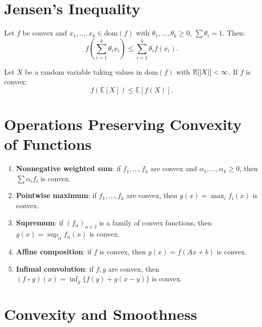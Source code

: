 \section{Jensen's Inequality}

\begin{theorem}
Let $f$ be convex and $x_1, \ldots, x_k \in \mathrm{dom}(f)$ with
$\theta_1, \ldots, \theta_k \geq 0$, $\sum \theta_i = 1$. Then:
\[
    f\left(\sum_{i=1}^k \theta_i x_i\right) \leq \sum_{i=1}^k \theta_i f(x_i).
\]
\end{theorem}

\begin{corollary}
Let $X$ be a random variable taking values in $\mathrm{dom}(f)$ with
$\mathbb{E}[\left| X \right|] < \infty$. If $f$ is convex:
\[
    f(\mathbb{E}[X]) \leq \mathbb{E}[f(X)].
\]
\end{corollary}

\section{Operations Preserving Convexity of Functions}

\begin{theorem}
\label{thm:function_operations}
\begin{enumerate}
    \item \textbf{Nonnegative weighted sum}: if $f_1, \ldots, f_k$ are convex and
          $\alpha_1, \ldots, \alpha_k \geq 0$, then $\sum \alpha_i f_i$ is convex.
    \item \textbf{Pointwise maximum}: if $f_1, \ldots, f_k$ are convex, then
          $g(x) = \max_i f_i(x)$ is convex.
    \item \textbf{Supremum}: if $(f_\alpha)_{\alpha \in I}$ is a family of convex
          functions, then $g(x) = \sup_\alpha f_\alpha(x)$ is convex.
    \item \textbf{Affine composition}: if $f$ is convex, then $g(x) = f(Ax + b)$
          is convex.
    \item \textbf{Infimal convolution}: if $f, g$ are convex, then
          $(f \mathop{\square} g)(x) = \inf_y \{f(y) + g(x-y)\}$ is convex.
\end{enumerate}
\end{theorem}

\section{Convexity and Smoothness}

